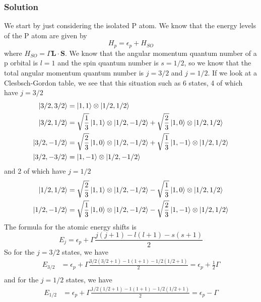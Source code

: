 \documentclass{article}
\begin{document}
\subsubsection{Solution}
We start by just considering the isolated P atom. We know that the energy levels of the P atom are given by
\begin{equation}
    H_p = \epsilon_p + H_{SO}
\end{equation}
where $H_{SO} = \Gamma \mathbf{L} \cdot \mathbf{S}$. We know that the angular momentum quantum number of a p orbital is $l=1$ and the spin quantum number is $s=1/2$, so we know that the total angular momentum quantum number is $j=3/2$ and $j=1/2$.  If we look at a Clesbsch-Gordon table, we see that this situation such as 6 states, 4 of which have $j=3/2$
\begin{align}
    \ket{3/2, 3/2} &= \ket{1,1}\otimes\ket{1/2,1/2}\\
    \ket{3/2, 1/2} &=\sqrt{\frac{1}{3}}\ket{1,1}\otimes\ket{1/2,-1/2} + \sqrt{\frac{2}{3}}\ket{1,0}\otimes\ket{1/2,1/2}\\
    \ket{3/2, -1/2} &=\sqrt{\frac{2}{3}}\ket{1,0}\otimes\ket{1/2,-1/2} + \sqrt{\frac{1}{3}}\ket{1,-1}\otimes\ket{1/2,1/2}\\
    \ket{3/2, -3/2} &= \ket{1,-1}\otimes\ket{1/2,-1/2}
\end{align}
and 2 of which have $j=1/2$
\begin{align}
    \ket{1/2, 1/2} &= \sqrt{\frac{2}{3}}\ket{1,1}\otimes\ket{1/2,-1/2} - \sqrt{\frac{1}{3}}\ket{1,0}\otimes\ket{1/2,1/2}\\
    \ket{1/2, -1/2} &= \sqrt{\frac{1}{3}}\ket{1,0}\otimes\ket{1/2,-1/2} - \sqrt{\frac{2}{3}}\ket{1,-1}\otimes\ket{1/2,1/2}
\end{align}
The formula for the atomic energy shifts is 
\begin{equation}
    E_{j} = \epsilon_p + \Gamma \frac{j(j+1)-l(l+1)-s(s+1)}{2}
\end{equation}
So for the $j=3/2$ states, we have
\begin{align}
    E_{3/2} &= \epsilon_p + \Gamma \frac{3/2(3/2+1)-1(1+1)-1/2(1/2+1)}{2} = \epsilon_p + \frac{1}{2}\Gamma\\
\end{align}
and for the $j=1/2$ states, we have
\begin{align}
    E_{1/2} &= \epsilon_p + \Gamma \frac{1/2(1/2+1)-1(1+1)-1/2(1/2+1)}{2} = \epsilon_p - \Gamma\\
\end{align}
\end{document}
